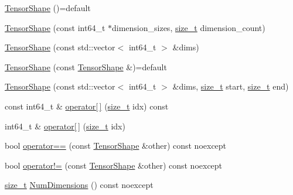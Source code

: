 \begin{DoxyCompactItemize}
\item 
\mbox{\hyperlink{classonnxruntime_1_1TensorShape_a6ef240d824ddcd9e45c720fe70b84d3c}{Tensor\+Shape}} ()=default
\item 
\mbox{\hyperlink{classonnxruntime_1_1TensorShape_a0e4795044253526b2c86a00d2d123c16}{Tensor\+Shape}} (const int64\+\_\+t $\ast$dimension\+\_\+sizes, \mbox{\hyperlink{mlasi_8h_a503efbc1c6e50825320ad909366b78ab}{size\+\_\+t}} dimension\+\_\+count)
\item 
\mbox{\hyperlink{classonnxruntime_1_1TensorShape_adda04711ceba341a94da2438c82b71c4}{Tensor\+Shape}} (const std\+::vector$<$ int64\+\_\+t $>$ \&dims)
\item 
\mbox{\hyperlink{classonnxruntime_1_1TensorShape_a2c8f0b8703f40eff16e086b43138d8aa}{Tensor\+Shape}} (const \mbox{\hyperlink{classonnxruntime_1_1TensorShape}{Tensor\+Shape}} \&)=default
\item 
\mbox{\hyperlink{classonnxruntime_1_1TensorShape_a4ae80dbb6c8da7a2cb796d25c0e5bf4d}{Tensor\+Shape}} (const std\+::vector$<$ int64\+\_\+t $>$ \&dims, \mbox{\hyperlink{mlasi_8h_a503efbc1c6e50825320ad909366b78ab}{size\+\_\+t}} start, \mbox{\hyperlink{mlasi_8h_a503efbc1c6e50825320ad909366b78ab}{size\+\_\+t}} end)
\item 
const int64\+\_\+t \& \mbox{\hyperlink{classonnxruntime_1_1TensorShape_ad1bec011064e3c4bcc139327decfd537}{operator\mbox{[}$\,$\mbox{]}}} (\mbox{\hyperlink{mlasi_8h_a503efbc1c6e50825320ad909366b78ab}{size\+\_\+t}} idx) const
\item 
int64\+\_\+t \& \mbox{\hyperlink{classonnxruntime_1_1TensorShape_a49b51462f8cd8942887641a01fbe300b}{operator\mbox{[}$\,$\mbox{]}}} (\mbox{\hyperlink{mlasi_8h_a503efbc1c6e50825320ad909366b78ab}{size\+\_\+t}} idx)
\item 
bool \mbox{\hyperlink{classonnxruntime_1_1TensorShape_ad88c9c2b880bbcf1fc1116993f4dee36}{operator==}} (const \mbox{\hyperlink{classonnxruntime_1_1TensorShape}{Tensor\+Shape}} \&other) const noexcept
\item 
bool \mbox{\hyperlink{classonnxruntime_1_1TensorShape_a5adff36f4e3efc2e2b337a2e78210256}{operator!=}} (const \mbox{\hyperlink{classonnxruntime_1_1TensorShape}{Tensor\+Shape}} \&other) const noexcept
\item 
\mbox{\hyperlink{mlasi_8h_a503efbc1c6e50825320ad909366b78ab}{size\+\_\+t}} \mbox{\hyperlink{classonnxruntime_1_1TensorShape_af9e40196654d3d161544789f61415c53}{Num\+Dimensions}} () const noexcept
\item 

\end{DoxyCompactItemize}
